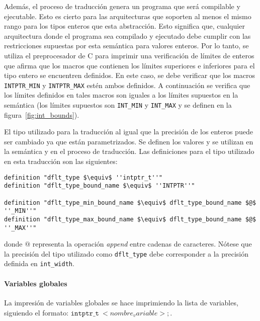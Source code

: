 Además, el proceso de traducción genera un programa que será compilable y ejecutable.
Esto es cierto para las arquitecturas que soporten al menos el mismo rango para los tipos enteros que esta abstracción.
Esto significa que, cualquier arquitectura donde el programa sea compilado y ejecutado debe cumplir con las restricciones supuestas por esta semántica para valores enteros.
Por lo tanto, se utiliza el preprocesador de C para imprimir una verificación de límites de enteros que afirma que los macros que contienen los límites superiores e inferiores para el tipo entero se encuentren definidos.
En este caso, se debe verificar que los macros \verb|INTPTR_MIN| y \verb|INTPTR_MAX| estén ambos definidos.
A continuación se verifica que los límites definidos en tales macros son iguales a los límites supuestos en la semántica (los límites supuestos son \verb|INT_MIN| y \verb|INT_MAX| y se definen en la figura~\ref{fig:int_bounds}).


El tipo utilizado para la traducción al igual que la precisión de los enteros puede ser cambiado ya que están parametrizados.
Se definen los valores y se utilizan en la semántica y en el proceso de traducción.
Las definiciones para el tipo utilizado en esta traducción son las siguientes:

\begin{lstlisting}[frame=single, mathescape=true]
definition "dflt_type $\equiv$ ''intptr_t''"
definition "dflt_type_bound_name $\equiv$ ''INTPTR''"

definition "dflt_type_min_bound_name $\equiv$ dflt_type_bound_name $@$ ''_MIN''"
definition "dflt_type_max_bound_name $\equiv$ dflt_type_bound_name $@$ ''_MAX''"
\end{lstlisting}

donde $@$ representa la operación \textit{append} entre cadenas de caracteres.
Nótese que la precisión del tipo utilizado como \verb|dflt_type| debe corresponder a la precisión definida en \verb|int_width|.

\paragraph*{Variables globales}

La impresión de variables globales se hace imprimiendo la lista de variables, siguiendo el formato: $\mathtt{intptr\_t}\ <nombre_variable>;$.

\begin{comment}
\begin{equation*}
\begin{split}
& \mathtt{intptr\_t}\ <variable\_name_0>; \\
& \vdots \\
& \mathtt{intptr\_t}\ <variable\_name_n>; \\
\end{split}
\end{equation*}
\end{comment}

